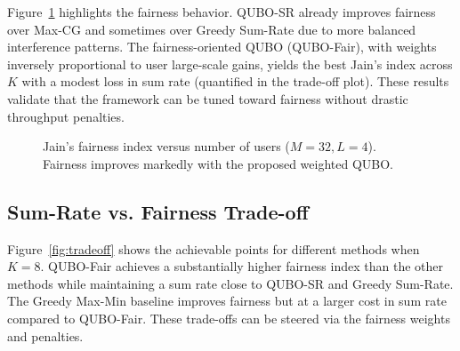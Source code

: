 Figure~\ref{fig:fairness} highlights the fairness behavior. QUBO-SR already improves fairness over Max-CG and sometimes over Greedy Sum-Rate due to more balanced interference patterns. The fairness-oriented QUBO (QUBO-Fair), with weights inversely proportional to user large-scale gains, yields the best Jain’s index across $K$ with a modest loss in sum rate (quantified in the trade-off plot). These results validate that the framework can be tuned toward fairness without drastic throughput penalties.

\begin{figure}[htbp]
\centering
{}
\caption{Jain's fairness index versus number of users ($M=32, L=4$). Fairness improves markedly with the proposed weighted QUBO.}
\label{fig:fairness}
\end{figure}

\subsection{Sum-Rate vs. Fairness Trade-off}

Figure~\ref{fig:tradeoff} shows the achievable points for different methods when $K=8$. QUBO-Fair achieves a substantially higher fairness index than the other methods while maintaining a sum rate close to QUBO-SR and Greedy Sum-Rate. The Greedy Max-Min baseline improves fairness but at a larger cost in sum rate compared to QUBO-Fair. These trade-offs can be steered via the fairness weights and penalties.

